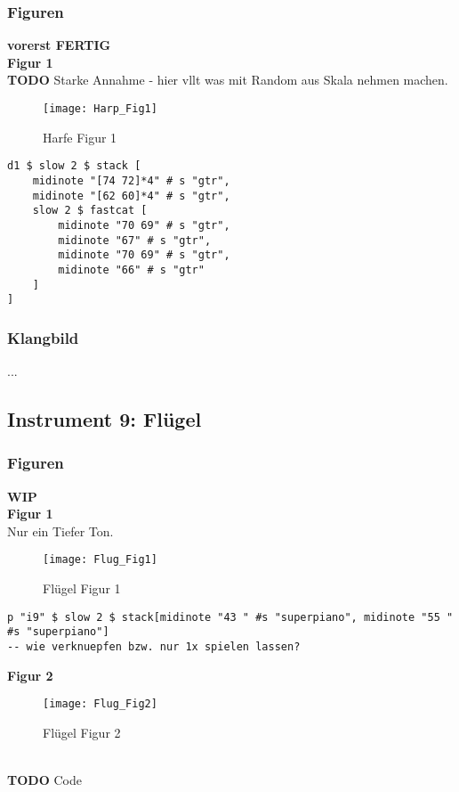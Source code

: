 \documentclass[
10pt, %
a4paper, %
oneside, %
headinclude,footinclude, %
BCOR5mm, %
]{scrartcl}
\begin{document}
\subsubsection{Figuren}
{\color{green}\textbf{vorerst FERTIG}} \\
\noindent\textbf{Figur 1}\\
{\color{red}\textbf{TODO}} Starke Annahme - hier vllt was mit Random aus Skala nehmen machen.
\begin{figure}[h]
	\centering 
	\texttt{[image: Harp\_Fig1]} 
	\caption{Harfe Figur 1}
\end{figure}

\begin{lstlisting}
d1 $ slow 2 $ stack [
	midinote "[74 72]*4" # s "gtr", 
	midinote "[62 60]*4" # s "gtr", 
	slow 2 $ fastcat [
		midinote "70 69" # s "gtr", 
		midinote "67" # s "gtr",
		midinote "70 69" # s "gtr", 
		midinote "66" # s "gtr"    
	]
]
\end{lstlisting}



\subsubsection{Klangbild}
...

\subsection{Instrument 9: Flügel}
\subsubsection{Figuren}
{\color{orange}\textbf{WIP}} \\
\noindent\textbf{Figur 1}\\
Nur ein Tiefer Ton.
\begin{figure}[h]
	\centering 
	\texttt{[image: Flug\_Fig1]} 
	\caption{Flügel Figur 1}
\end{figure}

\begin{lstlisting}
p "i9" $ slow 2 $ stack[midinote "43 " #s "superpiano", midinote "55 " #s "superpiano"]
-- wie verknuepfen bzw. nur 1x spielen lassen?
\end{lstlisting}

\noindent \textbf{Figur 2}\\
\begin{figure}[h]
	\centering 
	\texttt{[image: Flug\_Fig2]} 
	\caption{Flügel Figur 2}
\end{figure}\\
{\color{red}\textbf{TODO}} Code\\
\end{document}
